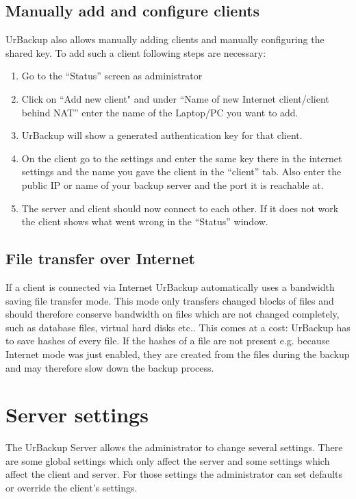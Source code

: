 \documentclass[a4paper,10pt]{article}
\begin{document}
\subsection{Manually add and configure clients}
\label{manual_internet_client}

UrBackup also allows manually adding clients and manually configuring the shared key. To
add such a client following steps are necessary:

\begin{enumerate}
  \item Go to the ``Status'' screen as administrator
  \item Click on ``Add new client" and under ``Name of new Internet client/client behind NAT'' enter the name of the Laptop/PC you want to add.
  \item UrBackup will show a generated authentication key for that client.
  \item On the client go to the settings and enter the same key there in the internet settings and the name you gave the client in the ``client'' tab.
  Also enter the public IP or name of your backup server and the port it is reachable at.
  \item The server and client should now connect to each other. If it does not work the client shows what went wrong
  in the ``Status'' window.
\end{enumerate}

\subsection{File transfer over Internet}

If a client is connected via Internet UrBackup automatically uses a bandwidth saving
file transfer mode. This mode only transfers changed blocks of files and should 
therefore conserve bandwidth on files which are not changed completely, such as
database files, virtual hard disks etc.. This comes at a cost: UrBackup has to save
hashes of every file. If the hashes of a file are not present e.g.
because Internet mode was just enabled, they are created from the files during
the backup and may therefore slow down the backup process. 

\section{Server settings}
\label{server_settings}

The UrBackup Server allows the administrator to change several settings. There
are some global settings which only affect the server and some settings which
affect the client and server. For those settings the administrator can set
defaults or override the client's settings.
\end{document}
